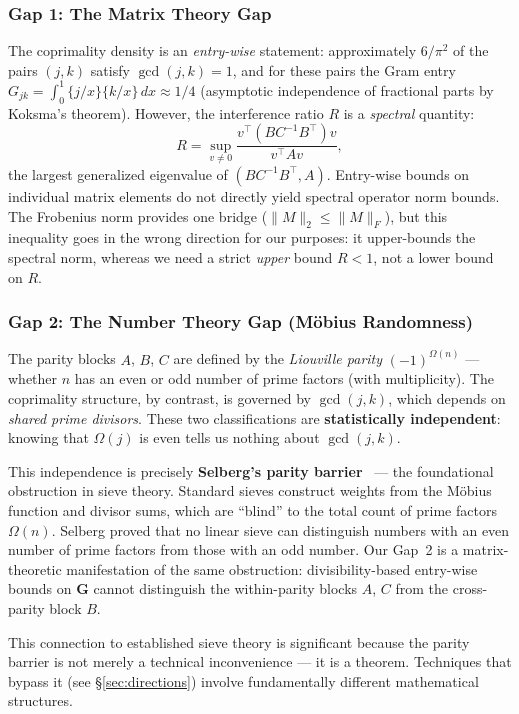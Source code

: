 \documentclass[11pt,a4paper]{article}
\theoremstyle{definition}
\theoremstyle{remark}
\newcommand{\Gram}{\mathbf{G}}
\begin{document}
\subsubsection*{Gap 1: The Matrix Theory Gap}

The coprimality density is an \emph{entry-wise} statement:
approximately $6/\pi^2$ of the pairs $(j,k)$ satisfy $\gcd(j,k) = 1$,
and for these pairs the Gram entry
$G_{jk} = \int_0^1 \{j/x\}\{k/x\}\,dx \approx 1/4$ (asymptotic
independence of fractional parts by Koksma's theorem). However,
the interference ratio $R$ is a \emph{spectral} quantity:
\[
  R = \sup_{v \neq 0} \frac{v^\top (BC^{-1}B^\top) v}{v^\top A v},
\]
the largest generalized eigenvalue of $(BC^{-1}B^\top, A)$.
Entry-wise bounds on individual matrix elements do not directly
yield spectral operator norm bounds. The Frobenius norm provides
one bridge ($\|M\|_2 \leq \|M\|_F$), but this inequality goes
in the wrong direction for our purposes: it upper-bounds the
spectral norm, whereas we need a strict \emph{upper} bound $R < 1$,
not a lower bound on $R$.

\subsubsection*{Gap 2: The Number Theory Gap (M\"obius Randomness)}

The parity blocks $A$, $B$, $C$ are defined by the \emph{Liouville
parity} $(-1)^{\Omega(n)}$ --- whether $n$ has an even or odd number
of prime factors (with multiplicity). The coprimality structure, by
contrast, is governed by $\gcd(j,k)$, which depends on
\emph{shared prime divisors}. These two classifications are
\textbf{statistically independent}: knowing that $\Omega(j)$ is even
tells us nothing about $\gcd(j,k)$.

This independence is precisely \textbf{Selberg's parity barrier}~\cite{selberg1956}
--- the foundational obstruction in sieve theory. Standard sieves
construct weights from the M\"obius function and divisor sums, which
are ``blind'' to the total count of prime factors $\Omega(n)$.
Selberg proved that no linear sieve can distinguish numbers with
an even number of prime factors from those with an odd number.
Our Gap~2 is a matrix-theoretic manifestation of the same obstruction:
divisibility-based entry-wise bounds on $\Gram$ cannot distinguish
the within-parity blocks $A$, $C$ from the cross-parity block $B$.

This connection to established sieve theory is significant because
the parity barrier is not merely a technical inconvenience --- it is
a theorem. Techniques that bypass it (see \S\ref{sec:directions})
involve fundamentally different mathematical structures.
\end{document}
